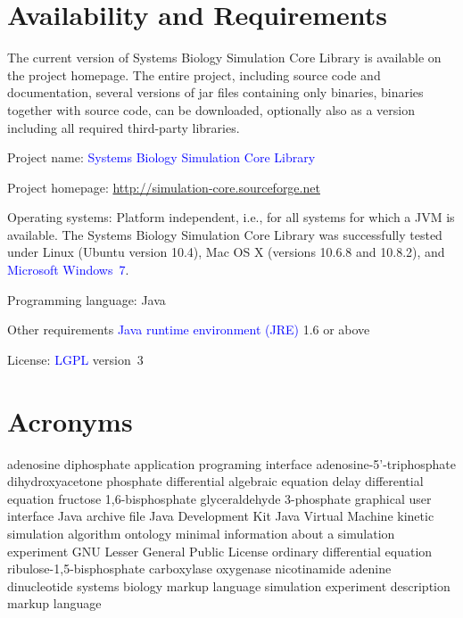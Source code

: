 \documentclass[10pt]{bmc_article}
\newenvironment{bmcformat}{\fussy\setboolean{publ}{true}}{\fussy}
\newcommand{\COR}[1]                      {\textcolor{blue}{#1}}
\begin{document}
\begin{bmcformat}
\section*{Availability and Requirements}
The current version of Systems Biology Simulation Core Library is available on the project homepage. The entire project, including source code and documentation, several versions of jar files containing only binaries, binaries together with source code, can be downloaded, optionally also as a version including all required third-party libraries.
\begin{description}
  \item{Project name:}         \COR{Systems Biology Simulation Core Library}
  \item{Project homepage:}     \COR{\url{http://simulation-core.sourceforge.net}}
  \item{Operating systems:}    Platform independent, i.e., for all systems for which a JVM
    is available. The Systems Biology Simulation Core Library was successfully 
    tested under Linux (Ubuntu version 10.4), Mac OS X (versions 10.6.8 and 10.8.2),
    and \COR{Microsoft\textsuperscript{\textregistered} Windows\textsuperscript{\textregistered}~7}.
  \item{Programming language:} Java\texttrademark
  \item{Other requirements}    \COR{Java runtime environment (JRE)} 1.6 or above
  \item{License:}              \COR{\acf{LGPL}} version~3
\end{description}

\section*{Acronyms}
\begin{acronym}
         {adenosine diphosphate}
         {application programing interface}
         {adenosine-5'-triphosphate}
        {dihydroxyacetone phosphate}
         {differential algebraic equation}
         {delay differential equation}
      {fructose 1,6-bisphosphate}
        {glyceraldehyde 3-phosphate}
         {graphical user interface}
         {Java archive file}
         {Java Development Kit}
         {Java Virtual Machine}
       {kinetic simulation algorithm ontology}
       {minimal information about a simulation experiment}
        {GNU Lesser General Public License}
         {ordinary differential equation}
     {ribulose-1,5-bisphosphate carboxylase oxygenase}
     {nicotinamide adenine dinucleotide}
        {systems biology markup language}
      {simulation experiment description markup language}
\end{acronym}



\end{bmcformat}
\end{document}
